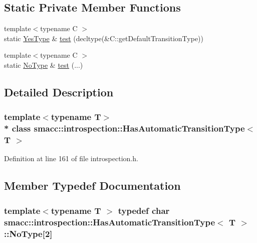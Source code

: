 \subsection*{Static Private Member Functions}
\begin{DoxyCompactItemize}
\item 
{\footnotesize template$<$typename C $>$ }\\static \hyperlink{classsmacc_1_1introspection_1_1HasAutomaticTransitionType_abeb599df547eb3db36684b6cb343eade}{Yes\+Type} \& \hyperlink{classsmacc_1_1introspection_1_1HasAutomaticTransitionType_a3521b68e2adb57520d3ca8cfbea082fb}{test} (decltype(\&C\+::get\+Default\+Transition\+Type))
\item 
{\footnotesize template$<$typename C $>$ }\\static \hyperlink{classsmacc_1_1introspection_1_1HasAutomaticTransitionType_aa2e976214fc770f53aaae67fc049caab}{No\+Type} \& \hyperlink{classsmacc_1_1introspection_1_1HasAutomaticTransitionType_a660ac4a6eac5d86d133f2cfb905d22f3}{test} (...)
\end{DoxyCompactItemize}


\subsection{Detailed Description}
\subsubsection*{template$<$typename T$>$\\*
class smacc\+::introspection\+::\+Has\+Automatic\+Transition\+Type$<$ T $>$}



Definition at line 161 of file introspection.\+h.



\subsection{Member Typedef Documentation}
\subsubsection[{\texorpdfstring{No\+Type}{NoType}}]{\setlength{\rightskip}{0pt plus 5cm}template$<$typename T $>$ typedef char {\bf smacc\+::introspection\+::\+Has\+Automatic\+Transition\+Type}$<$ T $>$\+::No\+Type\mbox{[}2\mbox{]}\hspace{0.3cm}{\ttfamily [private]}}\hypertarget{classsmacc_1_1introspection_1_1HasAutomaticTransitionType_aa2e976214fc770f53aaae67fc049caab}{}\label{classsmacc_1_1introspection_1_1HasAutomaticTransitionType_aa2e976214fc770f53aaae67fc049caab}


